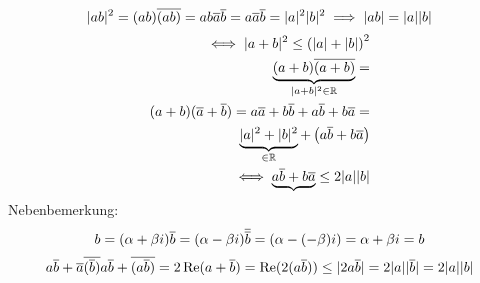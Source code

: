 \begin{Bew}
  \begin{equation*}
    \abs{ab}^2=(ab)\ol{(ab)}=ab\ol a\ol b=a\ol a\ol b=\abs{a}^2\abs{b}^2\\
    \implies \abs{ab}=\abs{a}\abs{b}
  \end{equation*}
  \begin{align*}
    \iff \abs{a+b}^2\leq\left( \abs{a}+\abs{b} \right)^2\\
    \underbrace{(a+b)\ol{(a+b)}}_{\abs{a+b}^2\in\mb{R}}=\\
    (a+b)(\ol a+\ol b)=a\ol a+b\ol b+a\ol b+b\ol a =\\
    \underbrace{\abs{a}^2+\abs{b}^2}_{\in\mb{R}}+\left( a\ol b+b\ol a \right)\\
    \iff \underbrace{a\ol b+b\ol a}\leq 2\abs{a}\abs{b}\\
  \end{align*}
  Nebenbemerkung:
  \begin{equation*}
    b=(\alpha+\beta i)\\
    \ol b=(\alpha - \beta i)\\
    \ol{\ol b}=\left( \alpha-(-\beta)i \right) = \alpha+\beta i = b
  \end{equation*}
  \begin{equation*}
    a\ol b+\ol a \ol{(\ol b)}\\
    a\ol b+\ol{(a\ol b)}=2\Re(a+\ol b)=\Re(2(a\ol b))\leq \abs{2a\ol b}\\
    =2\abs{a}\abs{\ol b}=2\abs{a}\abs{b}
  \end{equation*}
\end{Bew}
